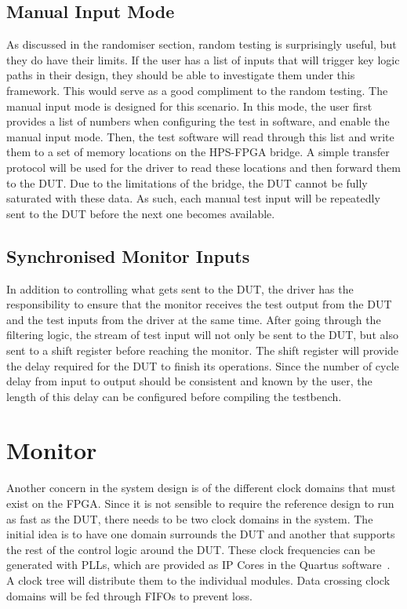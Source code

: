 \subsection{Manual Input Mode}

As discussed in the randomiser section, random testing is surprisingly useful, but they do have their limits.
If the user has a list of inputs that will trigger key logic paths in their design, they should be able to investigate them under this framework.
This would serve as a good compliment to the random testing.
The manual input mode is designed for this scenario.
In this mode, the user first provides a list of numbers when configuring the test in software, and enable the manual input mode.
Then, the test software will read through this list and write them to a set of memory locations on the HPS-FPGA bridge.
A simple transfer protocol will be used for the driver to read these locations and then forward them to the DUT.
Due to the limitations of the bridge, the DUT cannot be fully saturated with these data.
As such, each manual test input will be repeatedly sent to the DUT before the next one becomes available.

\subsection{Synchronised Monitor Inputs}
In addition to controlling what gets sent to the DUT, the driver has the responsibility to ensure that the monitor receives the test output from the DUT and the test inputs from the driver at the same time.
After going through the filtering logic, the stream of test input will not only be sent to the DUT, but also sent to a shift register before reaching the monitor.
The shift register will provide the delay required for the DUT to finish its operations.
Since the number of cycle delay from input to output should be consistent and known by the user, the length of this delay can be configured before compiling the testbench.


\section{Monitor}

Another concern in the system design is of the different clock domains that must exist on the FPGA.
Since it is not sensible to require the reference design to run as fast as the DUT, there needs to be two clock domains in the system.
The initial idea is to have one domain surrounds the DUT and another that supports the rest of the control logic around the DUT.
These clock frequencies can be generated with PLLs, which are provided as IP Cores in the Quartus software~\cite{Altera4}.
A clock tree will distribute them to the individual modules.
Data crossing clock domains will be fed through FIFOs to prevent loss.

